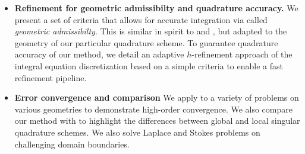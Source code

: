 \begin{itemize}

\item{\bf Refinement for geometric admissibilty and quadrature accuracy.}
We present a set of criteria that allows for accurate integration via \qbkix called \textit{geometric admissibilty}.
This is similar in spirit to \cite{RKO} and \cite{wala20193d}, but adapted to the geometry of our particular quadrature scheme.
To guarantee quadrature accuracy of our method, we detail an adaptive $h$-refinement approach of the integral equation discretization based on a simple criteria to enable a fast refinement pipeline.
\item {\bf Error convergence and comparison} We apply \qbkix to a variety of problems on various geometries to demonstrate high-order convergence. We also compare our method with \cite{YBZ} to highlight the differences between global and local singular quadrature schemes.  We also solve Laplace and Stokes problems on challenging domain boundaries.
\end{itemize}


